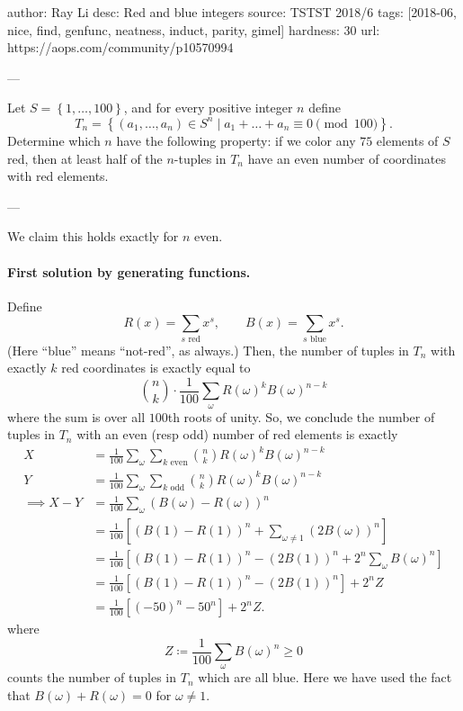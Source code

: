 author: Ray Li
desc: Red and blue integers
source: TSTST 2018/6
tags: [2018-06, nice, find, genfunc, neatness, induct, parity, gimel]
hardness: 30
url: https://aops.com/community/p10570994

---

Let $S = \left\{ 1, \dots, 100 \right\}$,
and for every positive integer $n$ define
\[
  T_n = \left\{ (a_1, \dots, a_n) \in S^n
    \mid a_1 + \dots + a_n \equiv 0 \pmod{100} \right\}.
\]
Determine which $n$ have the following property:
if we color any $75$ elements of $S$ red,
then at least half of the $n$-tuples in $T_n$
have an even number of coordinates with red elements.

---

We claim this holds exactly for $n$ even.

\paragraph{First solution by generating functions.}
Define
\[
  R(x) = \sum_{s \text{ red}} x^s, \qquad
  B(x) = \sum_{s \text{ blue}} x^s.
\]
(Here ``blue'' means ``not-red'', as always.)
Then, the number of tuples in $T_n$ with exactly
$k$ red coordinates is exactly equal to
\[ \binom nk \cdot \frac 1{100} \sum_{\omega} R(\omega)^k B(\omega)^{n-k} \]
where the sum is over all $100$th roots of unity.
So, we conclude the number of tuples in $T_n$
with an even (resp odd) number of red elements is exactly
\begin{align*}
  X &= \frac1{100} \sum_{\omega} \sum_{k \text{ even}}
    \binom nk R(\omega)^k B(\omega)^{n-k} \\
  Y &= \frac1{100} \sum_{\omega} \sum_{k \text{ odd}}
    \binom nk R(\omega)^k B(\omega)^{n-k} \\
  \implies X-Y &= \frac 1{100} \sum_{\omega}
    \left( B(\omega)-R(\omega) \right)^n \\
  &= \frac 1{100} \left[
     \left( B(1)-R(1) \right)^n
     + \sum_{\omega \neq 1} (2B(\omega))^n \right] \\
  &= \frac 1{100} \left[ \left( B(1)-R(1) \right)^n - (2B(1))^n
    + 2^n \sum_{\omega} B(\omega)^n \right] \\
  &= \frac 1{100} \left[ \left( B(1)-R(1) \right)^n - (2B(1))^n \right]
    + 2^n Z \\
  &= \frac 1{100} \left[ \left( -50 \right)^n - 50^n \right] + 2^n Z.
\end{align*}
where
\[ Z \coloneqq \frac 1{100} \sum_{\omega} B(\omega)^n \ge 0 \]
counts the number of tuples in $T_n$ which are all blue.
Here we have used the fact that $B(\omega)+R(\omega)=0$
for $\omega \neq 1$.

